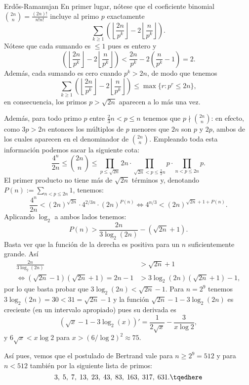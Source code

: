 \documentclass[teoria-numeros.tex]{subfiles}
\begin{document}
\begin{Proof}{Erd\H os-Ramanujan}
	En primer lugar, nótese que el coeficiente binomial $\binom{2n}{n} = \frac{(2n)!}{n! n!}$ incluye al primo $p$ exactamente
	$$ \sum_{k \ge 1} \left( \left\lfloor \frac{2n}{p^k} \right\rfloor - 2 \left\lfloor \frac{n}{p^k} \right\rfloor \right). $$
	Nótese que cada sumando es $\le 1$ pues es entero y
	$$ \left( \left\lfloor \frac{2n}{p^k} \right\rfloor - 2 \left\lfloor \frac{n}{p^k} \right\rfloor \right)
	< \frac{2n}{p^k} - 2\left( \frac{n}{p^k} - 1 \right) = 2. $$
	Además, cada sumando es cero cuando $p^k > 2n$, de modo que tenemos
	\begin{equation}
		\sum_{k \ge 1} \left( \left\lfloor \frac{2n}{p^k} \right\rfloor - 2 \left\lfloor \frac{n}{p^k} \right\rfloor \right) \le \max\{ r : p^r \le 2n \},
		\label{eq:bertrand_max}
	\end{equation}
	en consecuencia, los primos $p > \sqrt{2n}$ aparecen a lo más una vez.

	Además, para todo primo $p$ entre $\frac{2}{3}n < p \le n$ tenemos que $p \nmid \binom{2n}{n}$:
	en efecto, como $3p > 2n$ entonces los múltiplos de $p$ menores que $2n$ son $p$ y $2p$, ambos de los cuales aparecen en el denominador de $\binom{2n}{n}$.
	Empleando toda esta información podemos sacar la siguiente cota:
	$$ \frac{4^n}{2n} \le \binom{2n}{n} \le \prod_{p \le \sqrt{2n}} 2n \cdot \prod_{\sqrt{2n} < p \le \frac{2}{3}n} p \cdot \prod_{n < p \le 2n} p. $$
	El primer producto no tiene más de $\sqrt{2n}$ términos y, denotando $P(n) := \sum_{n < p \le 2n} 1$, tenemos:
	$$ \frac{4^n}{2n} < (2n)^{\sqrt{2n}} \cdot 4^{2/3 n} \cdot (2n)^{P(n)} \iff 4^{n/3} < (2n)^{\sqrt{2n} + 1 + P(n)}. $$
	Aplicando $\log_2$ a ambos lados tenemos:
	$$ P(n) > \frac{2n}{3\log_2(2n)} - (\sqrt{2n} + 1). $$
	Basta ver que la función de la derecha es positiva para un $n$ suficientemente grande.
	Así
	\begin{align*}
		                      \frac{2n}{3\log_2(2n)} &> \sqrt{2n} + 1 \\
		\iff (\sqrt{2n} - 1)(\sqrt{2n} + 1) = 2n - 1 &> 3\log_2(2n)(\sqrt{2n} + 1) - 1,
	\end{align*}
	por lo que basta probar que $3\log_2(2n) < \sqrt{2n} - 1$.
	Para $n = 2^9$ tenemos $3\log_2(2n) = 30 < 31 = \sqrt{2n} - 1$ y la función $\sqrt{2n} - 1 - 3\log_2(2n)$ es creciente
	(en un intervalo apropiado) pues su derivada es
	$$ ( \sqrt{x} - 1 - 3\log_2(x) )' = \frac{1}{2\sqrt{x}} - \frac{3}{x\log 2}, $$
	y $6\sqrt{x} < x\log 2$ para $x > \left( 6/\log 2 \right)^2 \approx 75$.

	Así pues, vemos que el postulado de Bertrand vale para $n \ge 2^9 = 512$ y para $n < 512$ también por la siguiente lista de primos:
	\begin{equation}
		3, \; 5, \; 7, \; 13, \; 23, \; 43, \; 83, \; 163, \; 317, \; 631.
		\tqedhere
	\end{equation}
\end{Proof}
\end{document}
